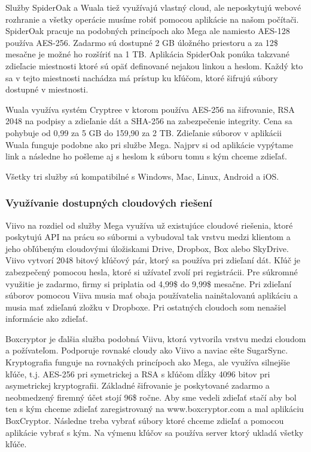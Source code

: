 		Služby SpiderOak \cite{spideroak} a Wuala \cite{wuala} tiež využívajú vlastný cloud, ale neposkytujú webové rozhranie a všetky operácie musíme robiť pomocou aplikácie na našom počítači. SpiderOak pracuje na podobných princípoch ako Mega ale namiesto AES-128 používa AES-256. Zadarmo sú dostupné 2 GB úložného priestoru a za 12\$ mesačne je možné ho rozšíriť na 1 TB. Aplikácia SpiderOak ponúka takzvané zdieľacie miestnosti ktoré sú opäť definované nejakou linkou a heslom. Každý kto sa v tejto miestnosti nachádza má prístup ku kľúčom, ktoré šifrujú súbory dostupné v miestnosti.
		
		 Wuala využíva systém Cryptree \cite{cryptree} v ktorom používa AES-256 na šifrovanie, RSA 2048 na podpisy a zdieľanie dát a SHA-256 na zabezpečenie integrity. Cena sa pohybuje od 0,99 \EUR{} za 5 GB do 159,90 \EUR{} za 2 TB. Zdieľanie súborov v aplikácii Wuala funguje podobne ako pri službe Mega. Najprv si od aplikácie vypýtame link a následne ho pošleme aj s heslom k súboru tomu s kým chceme zdieľať.
		 
		 Všetky tri služby sú kompatibilné s Windows, Mac, Linux, Android a iOS.
		
	\subsubsection{Využívanie dostupných cloudových riešení}
		Viivo \cite{viivo} na rozdiel od služby Mega využíva už existujúce cloudové riešenia, ktoré poskytujú API na prácu so súbormi a vybudoval tak vrstvu medzi klientom a jeho obľúbeným cloudovými úložiskami Drive, Dropbox, Box alebo SkyDrive. Viivo vytvorí 2048 bitový kľúčový pár, ktorý sa používa pri zdieľaní dát. Kľúč je zabezpečený pomocou hesla, ktoré si užívateľ zvolí pri registrácii. Pre súkromné využitie je zadarmo, firmy si priplatia od 4,99\$ do 9,99\$ mesačne. Pri zdieľaní súborov pomocou Viiva musia mať obaja používatelia nainštalovanú aplikáciu a musia mať zdieľanú zložku v Dropboxe. Pri ostatných cloudoch som nenašiel informácie ako zdieľať.
		
		Boxcryptor \cite{boxcryptor} je ďalšia služba podobná Viivu, ktorá vytvorila vrstvu medzi cloudom a požívateľom. Podporuje rovnaké cloudy ako Viivo a naviac ešte SugarSync. Kryptografia funguje na rovnakých princípoch ako Mega, ale využíva silnejšie kľúče, t.j. AES-256 pri symetrickej a RSA s kľúčom dĺžky 4096 bitov pri asymetrickej kryptografii. Základné šifrovanie je poskytované zadarmo a neobmedzený firemný účet stojí 96\$ ročne. Aby sme vedeli zdieľať stačí aby bol ten s kým chceme zdieľať zaregistrovaný na www.boxcryptor.com a mal aplikáciu BoxCryptor. Následne treba vybrať súbory ktoré chceme zdieľať a pomocou aplikácie vybrať s kým. Na výmenu kľúčov sa používa server ktorý ukladá všetky kľúče.
		
